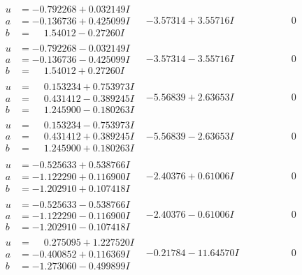 \documentclass[1p]{elsarticle_modified}
\theoremstyle{definition}
\begin{document}
$$\begin{array}{c|c|c}
\begin{aligned}
u &= -0.792268 + 0.032149 I \\
a &= -0.136736 + 0.425099 I \\
b &= \phantom{-}1.54012 - 0.27260 I\end{aligned}
 & -3.57314 + 3.55716 I & \phantom{-0.000000 } 0 \\ \hline\begin{aligned}
u &= -0.792268 - 0.032149 I \\
a &= -0.136736 - 0.425099 I \\
b &= \phantom{-}1.54012 + 0.27260 I\end{aligned}
 & -3.57314 - 3.55716 I & \phantom{-0.000000 } 0 \\ \hline\begin{aligned}
u &= \phantom{-}0.153234 + 0.753973 I \\
a &= \phantom{-}0.431412 - 0.389245 I \\
b &= \phantom{-}1.245900 - 0.180263 I\end{aligned}
 & -5.56839 + 2.63653 I & \phantom{-0.000000 } 0 \\ \hline\begin{aligned}
u &= \phantom{-}0.153234 - 0.753973 I \\
a &= \phantom{-}0.431412 + 0.389245 I \\
b &= \phantom{-}1.245900 + 0.180263 I\end{aligned}
 & -5.56839 - 2.63653 I & \phantom{-0.000000 } 0 \\ \hline\begin{aligned}
u &= -0.525633 + 0.538766 I \\
a &= -1.122290 + 0.116900 I \\
b &= -1.202910 + 0.107418 I\end{aligned}
 & -2.40376 + 0.61006 I & \phantom{-0.000000 } 0 \\ \hline\begin{aligned}
u &= -0.525633 - 0.538766 I \\
a &= -1.122290 - 0.116900 I \\
b &= -1.202910 - 0.107418 I\end{aligned}
 & -2.40376 - 0.61006 I & \phantom{-0.000000 } 0 \\ \hline\begin{aligned}
u &= \phantom{-}0.275095 + 1.227520 I \\
a &= -0.400852 + 0.116369 I \\
b &= -1.273060 - 0.499899 I\end{aligned}
 & -0.21784 - 11.64570 I & \phantom{-0.000000 } 0\\

\end{array}$$
\end{document}
